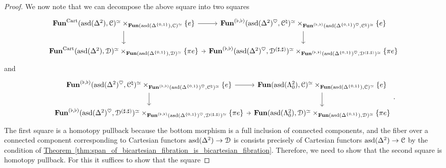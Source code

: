 \documentclass[main.tex]{subfiles}
\begin{document}
\begin{proof}
  We now note that we can decompose the above square into two squares
  \begin{equation*}
    \begin{tikzcd}[column sep=tiny]
      \Fun^{\Cart}(\asd(\Delta^{2}), \category{C})^{\simeq} \times_{\Fun(\asd(\Delta^{\{0, 1\}}), \category{C})^{\simeq}} \{e\}
      \arrow[r]
      \arrow[d]
      & \Fun^{(\flat, \flat)}(\asd(\Delta^{2})^{\heartsuit}, \category{C}^{\natural})^{\simeq} \times_{\Fun^{(\flat, \flat)}(\asd(\Delta^{\{0, 1\}})^{\heartsuit}, \category{C}^{\natural})^{\simeq}} \{e\}
      \arrow[d]
      \\
      \Fun^{\Cart}(\asd(\Delta^{2}), \category{D})^{\simeq} \times_{\Fun(\asd(\Delta^{\{0, 1\}}), \category{D})^{\simeq}} \{\pi e\}
      \arrow[r]
      & \Fun^{(\flat, \flat)}(\asd(\Delta^{2})^{\heartsuit}, \category{D}^{(\sharp, \sharp)})^{\simeq} \times_{\Fun^{(\flat, \flat)}(\asd(\Delta^{\{0, 1\}})^{\heartsuit}, \category{D}^{(\sharp, \sharp)})^{\simeq}} \{\pi e\}
    \end{tikzcd}
  \end{equation*}
  and
  \begin{equation*}
    \begin{tikzcd}[column sep=tiny]
      \Fun^{(\flat, \flat)}(\asd(\Delta^{2})^{\heartsuit}, \category{C}^{\natural})^{\simeq} \times_{\Fun^{(\flat, \flat)}(\asd(\Delta^{\{0, 1\}})^{\heartsuit}, \category{C}^{\natural})^{\simeq}} \{e\}
      \arrow[r]
      \arrow[d]
      & \Fun(\asd(\Lambda^{2}_{0}), \category{C})^{\simeq} \times_{\Fun(\asd(\Delta^{\{0, 1\}}), \category{C})^{\simeq}} \{e\}
      \arrow[d]
      \\
      \Fun^{(\flat, \flat)}(\asd(\Delta^{2})^{\heartsuit}, \category{D}^{(\sharp, \sharp)})^{\simeq} \times_{\Fun^{(\flat, \flat)}(\asd(\Delta^{\{0, 1\}})^{\heartsuit}, \category{D}^{(\sharp, \sharp)})^{\simeq}} \{\pi e\}
      \arrow[r]
      & \Fun(\asd(\Lambda^{2}_{0}), \category{D})^{\simeq} \times_{\Fun(\asd(\Delta^{\{0, 1\}}), \category{D})^{\simeq}} \{\pi e\}
    \end{tikzcd}.
  \end{equation*}
  The first square is a homotopy pullback because the bottom morphism is a full inclusion of connected components, and the fiber over a connected component corresponding to Cartesian functors $\mathrm{asd}(\Delta^{2}) \to \mathcal{D}$ is consists precisely of Cartesian functors $\mathrm{asd}(\Delta^{2}) \to \mathcal{C}$ by the condition of \hyperref[thm:span_of_bicartesian_fibration_is_bicartesian_fibration]{Theorem~\ref*{thm:span_of_bicartesian_fibration_is_bicartesian_fibration}}. Therefore, we need to show that the second square is homotopy pullback. For this it suffices to show that the square

\end{proof}
\end{document}
